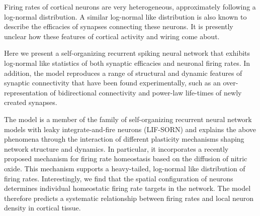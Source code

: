 \documentclass[10pt,letterpaper]{article}
\begin{document}
%
Firing rates of cortical neurons are very heterogeneous, approximately following a log-normal distribution. A similar log-normal like distribution is also known to describe the efficacies of synapses connecting these neurons. It is presently unclear how these features of cortical activity and wiring come about.

Here we present a self-organizing recurrent spiking neural network that exhibits log-normal like statistics of both synaptic efficacies and neuronal firing rates. In addition, the model reproduces a range of structural and dynamic features of synaptic connectivity that have been found experimentally, such as an over-representation of bidirectional connectivity and power-law life-times of newly created synapses.

The model is a member of the family of self-organizing recurrent neural network models with leaky integrate-and-fire neurons (LIF-SORN) and explains the above phenomena through the interaction of different plasticity mechanisms shaping network structure and dynamics. In particular, it incorporates a recently proposed mechanism for firing rate homeostasis based on the diffusion of nitric oxide. This mechanism supports a heavy-tailed, log-normal like distribution of firing rates. Interestingly, we find that the spatial configuration of neurons determines individual homeostatic firing rate targets in the network. The model therefore predicts a systematic relationship between firing rates and local neuron density in cortical tissue.


\end{document}
